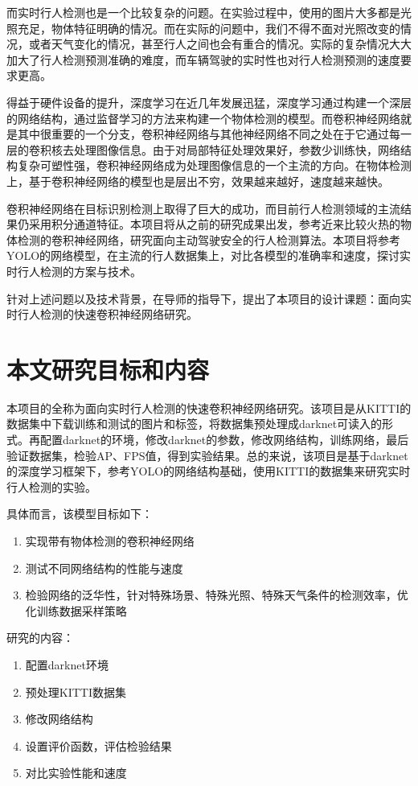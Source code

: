 {	而实时行人检测也是一个比较复杂的问题。在实验过程中，使用的图片大多都是光照充足，物体特征明确的情况。而在实际的问题中，我们不得不面对光照改变的情况，或者天气变化的情况，甚至行人之间也会有重合的情况。实际的复杂情况大大加大了行人检测预测准确的难度，而车辆驾驶的实时性也对行人检测预测的速度要求更高。

	得益于硬件设备的提升，深度学习在近几年发展迅猛，深度学习通过构建一个深层的网络结构，通过监督学习的方法来构建一个物体检测的模型。而卷积神经网络就是其中很重要的一个分支，卷积神经网络与其他神经网络不同之处在于它通过每一层的卷积核去处理图像信息。由于对局部特征处理效果好，参数少训练快，网络结构复杂可塑性强，卷积神经网络成为处理图像信息的一个主流的方向。在物体检测上，基于卷积神经网络的模型\cite{yolo,faster,ssd,fast,rich}也是层出不穷，效果越来越好，速度越来越快。

	卷积神经网络在目标识别检测上取得了巨大的成功，而目前行人检测领域的主流结果仍采用积分通道特征。本项目将从之前的研究成果出发，参考近来比较火热的物体检测的卷积神经网络，研究面向主动驾驶安全的行人检测算法。本项目将参考YOLO的网络模型，在主流的行人数据集上，对比各模型的准确率和速度，探讨实时行人检测的方案与技术。

	针对上述问题以及技术背景，在导师的指导下，提出了本项目的设计课题：面向实时行人检测的快速卷积神经网络研究。
}

\section{本文研究目标和内容}{
	本项目的全称为面向实时行人检测的快速卷积神经网络研究。该项目是从KITTI的数据集中下载训练和测试的图片和标签，将数据集预处理成darknet可读入的形式。再配置darknet的环境，修改darknet的参数，修改网络结构，训练网络，最后验证数据集，检验AP、FPS值，得到实验结果。总的来说，该项目是基于darknet的深度学习框架下，参考YOLO的网络结构基础，使用KITTI的数据集来研究实时行人检测的实验。

	具体而言，该模型目标如下：
	\begin{enumerate}
	\item 实现带有物体检测的卷积神经网络
	\item 测试不同网络结构的性能与速度
	\item 检验网络的泛华性，针对特殊场景、特殊光照、特殊天气条件的检测效率，优化训练数据采样策略
	\end{enumerate}

	研究的内容：
	\begin{enumerate}
	\item 配置darknet环境
	\item 预处理KITTI数据集
	\item 修改网络结构
	\item 设置评价函数，评估检验结果
	\item 对比实验性能和速度
	\end{enumerate}
}

